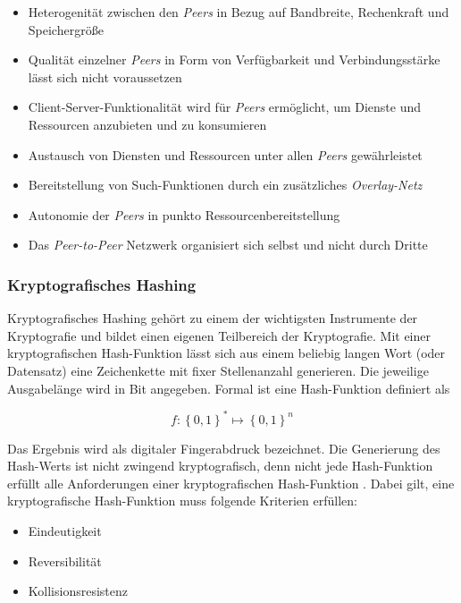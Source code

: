 \begin{itemize}
  \item Heterogenität zwischen den \textit{Peers} in Bezug auf Bandbreite, Rechenkraft und Speichergröße
  \item Qualität einzelner \textit{Peers} in Form von Verfügbarkeit und Verbindungsstärke lässt sich nicht voraussetzen
  \item Client-Server-Funktionalität wird für \textit{Peers} ermöglicht, um Dienste und Ressourcen anzubieten und zu konsumieren
  \item Austausch von Diensten und Ressourcen unter allen \textit{Peers} gewährleistet
  \item Bereitstellung von Such-Funktionen durch ein zusätzliches \textit{Overlay-Netz}
  \item Autonomie der \textit{Peers} in punkto Ressourcenbereitstellung
  \item Das \textit{Peer-to-Peer} Netzwerk organisiert sich selbst und nicht durch Dritte
\end{itemize}

\subsubsection{Kryptografisches Hashing}
Kryptografisches Hashing gehört zu einem der wichtigsten Instrumente der Kryptografie und bildet einen eigenen Teilbereich der Kryptografie. Mit einer kryptografischen Hash-Funktion lässt sich aus einem beliebig langen Wort (oder Datensatz) eine Zeichenkette mit fixer Stellenanzahl generieren. Die jeweilige Ausgabelänge wird in Bit angegeben. Formal ist eine Hash-Funktion definiert als

\begin{equation}
	f:\left \{ 0,1 \right \}^{*} \mapsto \left \{ 0,1 \right \}^{n}
\end{equation}

Das Ergebnis wird als digitaler Fingerabdruck bezeichnet. Die Generierung des Hash-Werts ist nicht zwingend kryptografisch, denn nicht jede Hash-Funktion erfüllt alle Anforderungen einer kryptografischen Hash-Funktion \citep{Menezes1997, Diffie1976}. Dabei gilt, eine kryptografische Hash-Funktion muss folgende Kriterien erfüllen:

\begin{itemize}
	\item Eindeutigkeit
	\item Reversibilität
	\item Kollisionsresistenz
\end{itemize}

